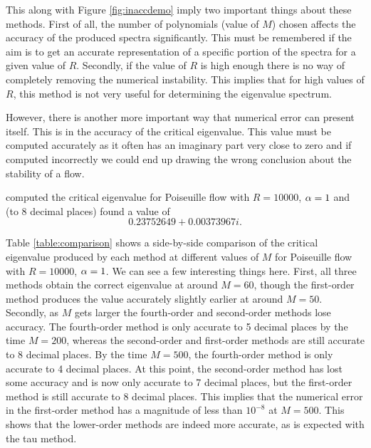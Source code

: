 This along with Figure \ref{fig:inaccdemo} imply two important things about these methods. First of all, the number of polynomials (value of $M $) chosen affects the accuracy of the produced spectra significantly. This must be remembered if the aim is to get an accurate representation of a specific portion of the spectra for a given value of $ R$. Secondly, if the value of $ R $ is high enough there is no way of completely removing the numerical instability. This implies that for high values of $R$, this method is not very useful for determining the eigenvalue spectrum. 

However, there is another more important way that numerical error can present itself. This is in the accuracy of the critical eigenvalue. This value must be computed accurately as it often has an imaginary part very close to zero and if computed incorrectly we could end up drawing the wrong conclusion about the stability of a flow.

\citet{orszag1971accurate} computed the critical eigenvalue for Poiseuille flow with $R = 10000$, $ \alpha = 1$ and (to 8 decimal places) found a value of 
\begin{equation}
     0.23752649 + 0.00373967i.
\end{equation} 

Table \ref{table:comparison} shows a side-by-side comparison of the critical eigenvalue produced by each method at different values of $M $ for Poiseuille flow with $ R = 10000$, $ \alpha = 1$. We can see a few interesting things here. First, all three methods obtain the correct eigenvalue at around $ M = 60$, though the first-order method produces the value accurately slightly earlier at around $M = 50$. Secondly, as $M $ gets larger the fourth-order and second-order methods lose accuracy. The fourth-order method is only accurate to 5 decimal places by the time $M = 200$, whereas the second-order and first-order methods are still accurate to 8 decimal places. By the time $M = 500$, the fourth-order method is only accurate to 4 decimal places. At this point, the second-order method has lost some accuracy and is now only accurate to 7 decimal places, but the first-order method is still accurate to 8 decimal places. This implies that the numerical error in the first-order method has a magnitude of less than $ 10^{-8}$ at $ M = 500$. This shows that the lower-order methods are indeed more accurate, as is expected with the tau method. 

